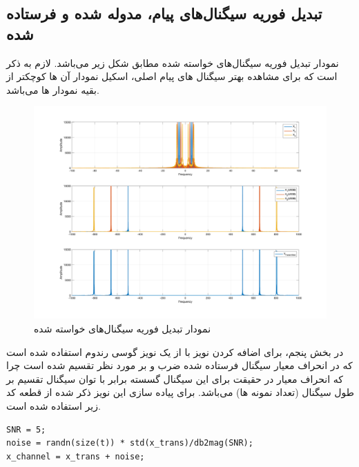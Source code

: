 \documentclass[10pt]{article}
\begin{document}
\subsection*{تبدیل فوریه سیگنال‌های پیام، مدوله شده و فرستاده شده}
\noindent
نمودار تبدیل فوریه سیگنال‌های خواسته شده مطابق شکل زیر می‌باشد. لازم به ذکر است که برای مشاهده بهتر سیگنال های پیام اصلی، اسکیل نمودار آن ها کوچکتر از بقیه نمودار ها می‌باشد.
\begin{figure}[h]
	\centering
	\includegraphics[width=0.95\linewidth]{../pics/q2-2}
	\caption{نمودار تبدیل فوریه سیگنال‌های خواسته شده}
	\label{fig:q2-2}
\end{figure}

\noindent
در بخش پنجم، برای اضافه کردن نویز با 
از یک نویز گوسی رندوم استفاده شده است که در انحراف معیار سیگنال فرستاده شده ضرب و بر 
 مورد نظر تقسیم شده است چرا که انحراف معیار در حقیقت برای این سیگنال گسسته برابر با توان سیگنال تقسیم بر طول سیگنال (تعداد نمونه ها) می‌باشد. برای پیاده سازی این نویز ذکر شده از قطعه کد زیر استفاده شده است.
\begin{latin}
\begin{tcolorbox}
\begin{Verbatim}
SNR = 5;
noise = randn(size(t)) * std(x_trans)/db2mag(SNR);
x_channel = x_trans + noise;
\end{Verbatim}
\end{tcolorbox}
\end{latin}
\newpage
\noindent
\end{document}
